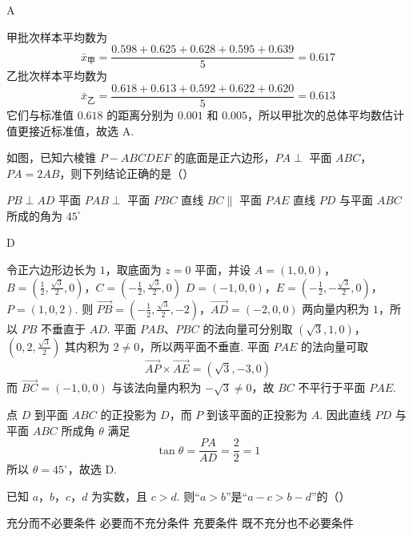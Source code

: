 \begin{answer}
A
\end{answer}

\begin{solution}
甲批次样本平均数为
\[
\bar{x}_{\text{甲}}=\frac{0.598+0.625+0.628+0.595+0.639}{5}=0.617
\]
乙批次样本平均数为
\[
\bar{x}_{\text{乙}}=\frac{0.618+0.613+0.592+0.622+0.620}{5}=0.613
\]
它们与标准值 \(0.618\) 的距离分别为 \(0.001\) 和 \(0.005\)，所以甲批次的总体平均数估计值更接近标准值，故选 A.
\end{solution}

\begin{problem}
如图，已知六棱锥 \(P - ABCDEF\) 的底面是正六边形，\(PA \perp\) 平面 \(ABC\)，\(PA = 2AB\)，则下列结论正确的是（\quad）


\choices
    {\(PB \perp AD\)}
    {平面 \(PAB \perp\) 平面 \(PBC\)}
    {直线 \(BC \parallel\) 平面 \(PAE\)}
    {直线 \(PD\) 与平面 \(ABC\) 所成的角为 \(45^{\circ}\)}
\end{problem}

\begin{answer}
D
\end{answer}

\begin{solution}
令正六边形边长为 \(1\)，取底面为 \(z=0\) 平面，并设
\(A=(1,0,0)\)，\(B=\left(\frac12,\frac{\sqrt3}{2},0\right)\)，\(C=\left(-\frac12,\frac{\sqrt3}{2},0\right)\)
\(D=(-1,0,0)\)，\(E=\left(-\frac12,-\frac{\sqrt3}{2},0\right)\)，\(P=(1,0,2)\).
则
\(\overrightarrow{PB}=\left(-\frac12,\frac{\sqrt3}{2},-2\right)\)，\(\overrightarrow{AD}=(-2,0,0)\)
两向量内积为 \(1\)，所以 \(PB\) 不垂直于 \(AD\). 平面 \(PAB\)、\(PBC\) 的法向量可分别取
\((\sqrt3,1,0)\)，\(\left(0,2,\frac{\sqrt3}{2}\right)\)
其内积为 \(2\ne0\)，所以两平面不垂直. 平面 \(PAE\) 的法向量可取
\[
\overrightarrow{AP}\times\overrightarrow{AE}=(\sqrt3,-3,0)
\]
而 \(\overrightarrow{BC}=(-1,0,0)\) 与该法向量内积为 \(-\sqrt3\ne0\)，故 \(BC\) 不平行于平面 \(PAE\).

点 \(D\) 到平面 \(ABC\) 的正投影为 \(D\)，而 \(P\) 到该平面的正投影为 \(A\). 因此直线 \(PD\) 与平面 \(ABC\) 所成角 \(\theta\) 满足
\[
\tan\theta=\frac{PA}{AD}=\frac{2}{2}=1
\]
所以 \(\theta=45^{\circ}\)，故选 D.
\end{solution}

\begin{problem}
已知 \(a\)，\(b\)，\(c\)，\(d\) 为实数，且 \(c > d\). 则“\(a > b\)”是“\(a - c > b - d\)”的（\quad）

\choices
    {充分而不必要条件}
    {必要而不充分条件}
    {充要条件}
    {既不充分也不必要条件}
\end{problem}

